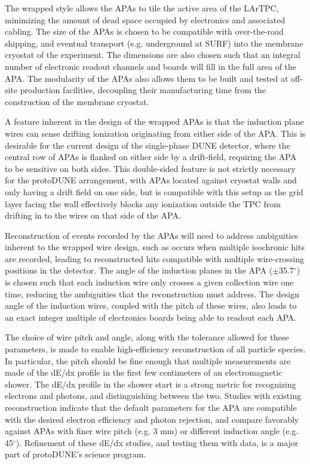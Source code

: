 The wrapped style allows the APAs to tile the active area of the LArTPC, minimizing the amount of dead space occupied by electronics and associated cabling.  The size of the APAs is chosen to be compatible with over-the-road shipping, and eventual transport (e.g. underground at SURF) into the membrane cryostat of the experiment.  The dimensions are also chosen such that an integral number of electronic readout channels and boards will fill in the full area of the APA. The modularity of the APAs also allows them to be built and tested at off-site production facilities, decoupling their manufacturing time from the construction of the membrane cryostat.  

A feature inherent in the design of the wrapped APAs is that the induction plane wires can sense drifting ionization originating from either side of the APA.  This is desirable for the current design of the single-phase DUNE detector, where the central row of APAs is flanked on either side by a drift-field, requiring the APA to be sensitive on both sides.  This double-sided feature is not strictly necessary for the protoDUNE arrangement, with APAs located against cryostat walls and only having a drift field on one side, but is compatible with this setup as the grid layer facing the wall effectively blocks any ionization outside the TPC from drifting in to the wires on that side of the APA.

Reconstruction of events recorded by the APAs will need to address ambiguities inherent to the wrapped wire design, such as occurs when multiple isochronic hits are recorded, leading to reconstructed hits compatible with multiple wire-crossing positions in the detector.  The angle of the induction planes in the APA ($\pm$35.7$^{\circ}$) is chosen such that each induction wire only crosses a given collection wire one time, reducing the ambiguities that the reconstruction must address.  The design angle of the induction wires, coupled with the pitch of these wires, also leads to an exact integer multiple of electronics boards being able to readout each APA.

The choice of wire pitch and angle, along with the tolerance allowed for these parameters, is made to enable high-efficiency reconstruction of all particle species.  In particular, the pitch should be fine enough that multiple measurements are made of the dE/dx profile in the first few centimeters of an electromagnetic shower.  The dE/dx profile in the shower start is a strong metric for recognizing electrons and photons, and distinguishing between the two.  Studies with existing reconstruction indicate that the default parameters for the APA are compatible with the desired electron efficiency and photon rejection, and compare favorably against APAs with finer wire pitch (e.g. 3 mm) or different induction angle (e.g. 45$^{\circ}$).  Refinement of these dE/dx studies, and testing them with data, is a major part of protoDUNE's science program.

